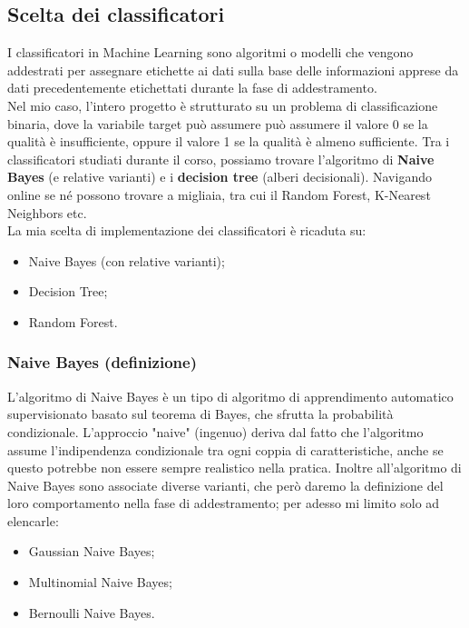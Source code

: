 \documentclass{article}
\begin{document}
\begin{titlepage}
        \subsection{Scelta dei classificatori}
        I classificatori in Machine Learning sono algoritmi o modelli che vengono addestrati per assegnare etichette ai dati sulla base delle informazioni apprese da dati precedentemente etichettati durante la fase di addestramento. \\
        Nel mio caso, l'intero progetto è strutturato su un problema di classificazione binaria, dove la variabile target può assumere può assumere il valore 0 se la qualità è insufficiente, oppure il valore 1 se la qualità è almeno sufficiente. Tra i classificatori studiati durante il corso, possiamo trovare l'algoritmo di \textbf{Naive Bayes} (e relative varianti) e i \textbf{decision tree} (alberi decisionali). Navigando online se né possono trovare a migliaia, tra cui il Random Forest, K-Nearest Neighbors etc. \\
        La mia scelta di implementazione dei classificatori è ricaduta su:
        \begin{itemize}
            \item Naive Bayes (con relative varianti);
            \item Decision Tree;
            \item Random Forest.
        \end{itemize}

        \newpage
        \subsubsection{Naive Bayes (definizione)}
        L'algoritmo di Naive Bayes è un tipo di algoritmo di apprendimento automatico supervisionato basato sul teorema di Bayes, che sfrutta la probabilità condizionale. L'approccio "naive" (ingenuo) deriva dal fatto che l'algoritmo assume l'indipendenza condizionale tra ogni coppia di caratteristiche, anche se questo potrebbe non essere sempre realistico nella pratica.
        Inoltre all'algoritmo di Naive Bayes sono associate diverse varianti, che però daremo la definizione del loro comportamento nella fase di addestramento; per adesso mi limito solo ad elencarle:
        \begin{itemize}
            \item Gaussian Naive Bayes;
            \item Multinomial Naive Bayes;
            \item Bernoulli Naive Bayes.
        \end{itemize}


\end{titlepage}
\end{document}
